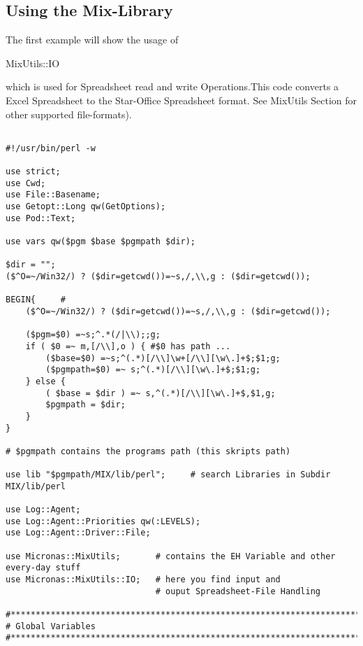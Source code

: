 \documentclass[a4paper,12pt]{article}
\begin{document}
\subsection{Using the Mix-Library}
The first example will show the usage of  \begin{tt}MixUtils::IO\end{tt} which is used for Spreadsheet read and write Operations.This code converts a Excel Spreadsheet to the Star-Office Spreadsheet format. See MixUtils Section for other supported file-formats).
\begin{verbatim}

#!/usr/bin/perl -w

use strict;
use Cwd;
use File::Basename;
use Getopt::Long qw(GetOptions);
use Pod::Text;

use vars qw($pgm $base $pgmpath $dir);

$dir = "";
($^O=~/Win32/) ? ($dir=getcwd())=~s,/,\\,g : ($dir=getcwd());

BEGIN{     # 
    ($^O=~/Win32/) ? ($dir=getcwd())=~s,/,\\,g : ($dir=getcwd());    

    ($pgm=$0) =~s;^.*(/|\\);;g;
    if ( $0 =~ m,[/\\],o ) { #$0 has path ...
        ($base=$0) =~s;^(.*)[/\\]\w+[/\\][\w\.]+$;$1;g;
        ($pgmpath=$0) =~ s;^(.*)[/\\][\w\.]+$;$1;g;
    } else {
        ( $base = $dir ) =~ s,^(.*)[/\\][\w\.]+$,$1,g;
        $pgmpath = $dir;
    }
}

# $pgmpath contains the programs path (this skripts path)

use lib "$pgmpath/MIX/lib/perl";     # search Libraries in Subdir MIX/lib/perl

use Log::Agent;
use Log::Agent::Priorities qw(:LEVELS);
use Log::Agent::Driver::File;

use Micronas::MixUtils;       # contains the EH Variable and other every-day stuff
use Micronas::MixUtils::IO;   # here you find input and 
                              # ouput Spreadsheet-File Handling

#******************************************************************************
# Global Variables
#******************************************************************************


\end{verbatim}
\end{document}
